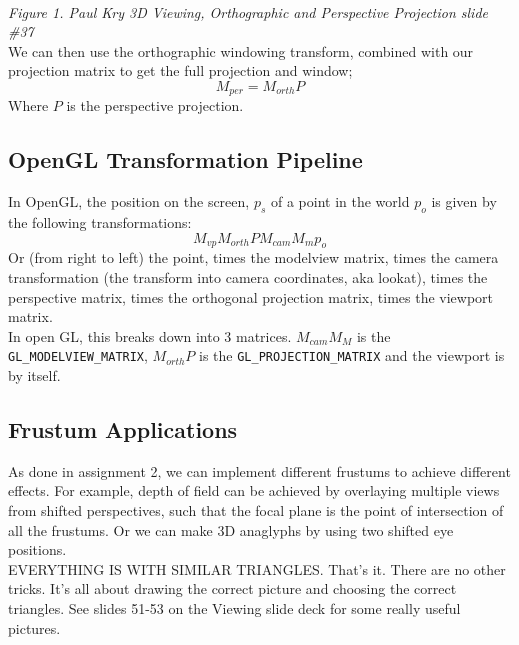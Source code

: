 \documentclass[12pt]{article}
\theoremstyle{definition}
\begin{document}
\\ \textit{Figure 1. Paul Kry 3D Viewing, Orthographic and Perspective Projection slide \#37}\\ \linebreak
We can then use the orthographic windowing transform, combined with our projection matrix to get the full projection and window;
$$M_{per} = M_{orth}P$$ 
Where $P$ is the perspective projection.
\\ \linebreak

\subsection{OpenGL Transformation Pipeline}
In OpenGL, the position on the screen, $p_s$ of a point in the world $p_o$ is given by the following transformations:
$$M_{vp}M_{orth}PM_{cam}M_mp_o$$
Or (from right to left) the point, times the modelview matrix, times the camera transformation (the transform into camera coordinates, aka lookat), times the perspective matrix, times the orthogonal projection matrix, times the viewport matrix.
\\ \linebreak
In open GL, this breaks down into 3 matrices. $M_{cam}M_M$ is the \texttt{GL\_MODELVIEW\_MATRIX}, $M_{orth}P$ is the \texttt{GL\_PROJECTION\_MATRIX} and the viewport is by itself.

\subsection{Frustum Applications}
As done in assignment 2, we can implement different frustums to achieve different effects. For example, depth of field can be achieved by overlaying multiple views from shifted perspectives, such that the focal plane is the point of intersection of all the frustums. Or we can make 3D anaglyphs by using two shifted eye positions. 
\\ \linebreak
EVERYTHING IS WITH SIMILAR TRIANGLES. That's it. There are no other tricks. It's all about drawing the correct picture and choosing the correct triangles. See slides 51-53 on the Viewing slide deck for some really useful pictures.
\end{document}
